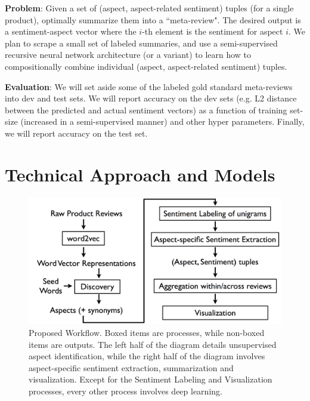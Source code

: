 \documentclass{article} %
\begin{document}
\textbf{Problem}: Given a set of (aspect, aspect-related sentiment) tuples (for a single product), optimally summarize them into a ``meta-review". The desired output is a sentiment-aspect vector where the $i$-th element is the sentiment for aspect $i$. We plan to scrape a small set of labeled summaries, and use a semi-supervised recursive neural network architecture (or a variant) to learn how to compositionally combine individual (aspect, aspect-related sentiment) tuples.%

\textbf{Evaluation}: We will set aside some of the labeled gold standard meta-reviews into dev and test sets. We will report accuracy on the dev sets (e.g. L2 distance between the predicted and actual sentiment vectors) as a function of training set-size (increased in a semi-supervised manner) and other hyper parameters. Finally, we will report accuracy on the test set.


\section{Technical Approach and Models} 

\begin{figure}[h]
\begin{center}
\includegraphics[width=1\columnwidth]{workflow.png}
\end{center}
\caption{Proposed Workflow. Boxed items are processes, while non-boxed items are outputs. The left half of the diagram details unsupervised aspect identification, while the right half of the diagram involves aspect-specific sentiment extraction, summarization and visualization. Except for the Sentiment Labeling and Visualization processes, every other process involves deep learning.}
\label{workflow}
\end{figure}
\end{document}
